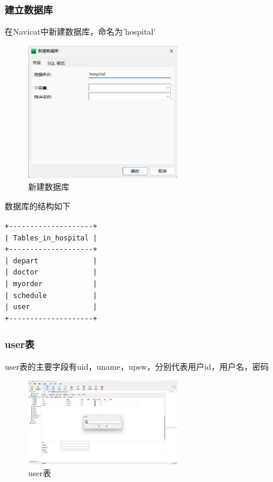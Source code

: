 \documentclass[UTF8,12pt]{article}
\begin{document}
\subsubsection{建立数据库}
在Navicat中新建数据库，命名为'hospital'
\begin{figure}[htbp]
    \centering
    \includegraphics[width=0.6\textwidth]{imgs/4.png}
    \caption{新建数据库}    
\end{figure}

数据库的结构如下

\begin{lstlisting}[frame=shadowbox]
+--------------------+
| Tables_in_hospital |
+--------------------+
| depart             |
| doctor             |
| myorder            |
| schedule           |
| user               |
+--------------------+
\end{lstlisting}


\subsubsection{user表}
user表的主要字段有uid，uname，upsw，分别代表用户id，用户名，密码

\newpage

\begin{figure}[htbp]
    \centering
    \includegraphics[width=0.6\textwidth]{imgs/5.png}
    \caption{user表}
\end{figure}
\end{document}
